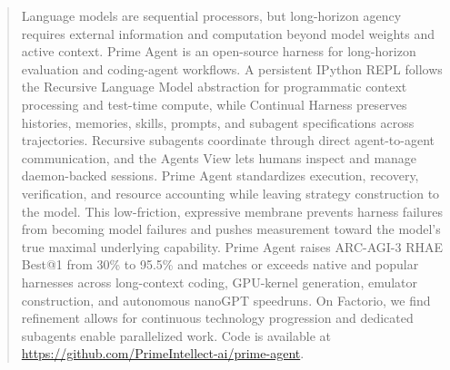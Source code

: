 \begin{abstract}
Language models are sequential processors, but long-horizon agency requires external information and computation beyond model weights and active context.
Prime Agent is an open-source harness for long-horizon evaluation and coding-agent workflows.
A persistent IPython REPL follows the Recursive Language Model abstraction for programmatic context processing and test-time compute, while Continual Harness preserves histories, memories, skills, prompts, and subagent specifications across trajectories.
Recursive subagents coordinate through direct agent-to-agent communication, and the Agents View lets humans inspect and manage daemon-backed sessions.
Prime Agent standardizes execution, recovery, verification, and resource accounting while leaving strategy construction to the model.
This low-friction, expressive membrane prevents harness failures from becoming model failures and pushes measurement toward the model's true maximal underlying capability.
Prime Agent raises ARC-AGI-3 RHAE Best@1 from 30\% to 95.5\% and matches or exceeds native and popular harnesses across long-context coding, GPU-kernel generation, emulator construction, and autonomous nanoGPT speedruns.
On Factorio, we find refinement allows for continuous technology progression and dedicated subagents enable parallelized work.
Code is available at \url{https://github.com/PrimeIntellect-ai/prime-agent}.
\end{abstract}
